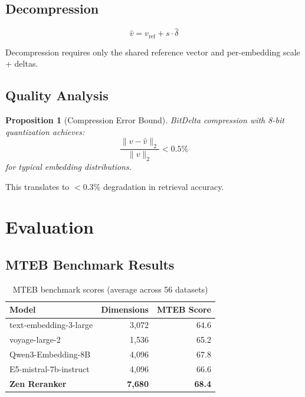 \documentclass[11pt,letterpaper]{article}
\newtheorem{proposition}[theorem]{Proposition}
\begin{document}
\subsection{Decompression}

\begin{equation}
\hat{v} = v_{\text{ref}} + s \cdot \hat{\delta}
\end{equation}

Decompression requires only the shared reference vector and per-embedding scale + deltas.

\subsection{Quality Analysis}

\begin{proposition}[Compression Error Bound]
BitDelta compression with 8-bit quantization achieves:
\begin{equation}
\frac{\|v - \hat{v}\|_2}{\|v\|_2} < 0.5\%
\end{equation}
for typical embedding distributions.
\end{proposition}

This translates to $<$0.3\% degradation in retrieval accuracy.

\section{Evaluation}
\label{sec:evaluation}

\subsection{MTEB Benchmark Results}

\begin{table}[h]
\centering
\caption{MTEB benchmark scores (average across 56 datasets)}
\label{tab:mteb}
\begin{tabular}{lrr}
\toprule
\textbf{Model} & \textbf{Dimensions} & \textbf{MTEB Score} \\
\midrule
text-embedding-3-large & 3,072 & 64.6 \\
voyage-large-2 & 1,536 & 65.2 \\
Qwen3-Embedding-8B & 4,096 & 67.8 \\
E5-mistral-7b-instruct & 4,096 & 66.6 \\
\textbf{Zen Reranker} & \textbf{7,680} & \textbf{68.4} \\
\bottomrule
\end{tabular}
\end{table}
\end{document}
